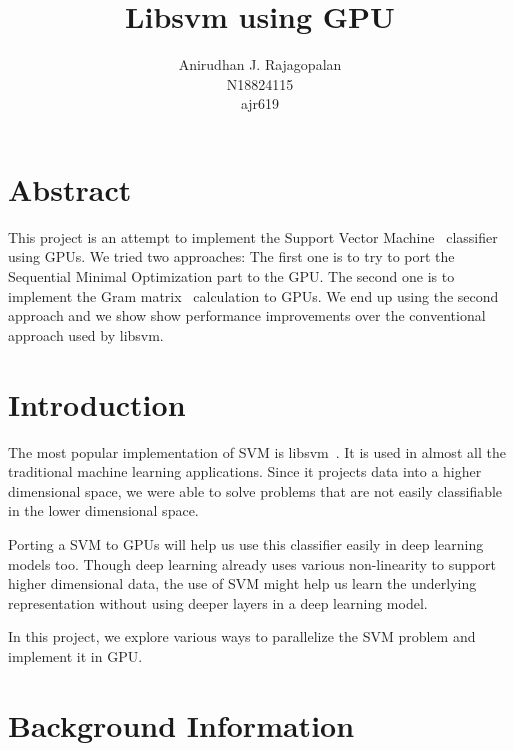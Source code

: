 \documentclass{article}
\begin{document}
\title{Libsvm using GPU}
\author{Anirudhan J. Rajagopalan \\ N18824115 \\ ajr619}
\maketitle




\newpage

\section{Abstract}
This project is an attempt to implement the Support Vector Machine~\cite{cortes1995} classifier using GPUs.
We tried two approaches: 
The first one is to try to port the Sequential Minimal Optimization part to the GPU\@.
The second one is to implement the Gram matrix~\cite{wiki:gram_matrix} calculation to GPUs.
We end up using the second approach and we show show performance improvements over the conventional approach used by libsvm. 
\section{Introduction}
The most popular implementation of SVM is libsvm~\cite{CC01a}.  
It is used in almost all the traditional machine learning applications.
Since it projects data into a higher dimensional space, we were able to solve problems that are not easily classifiable in the lower dimensional space.

Porting a SVM to GPUs will help us use this classifier easily in deep learning models too.
Though deep learning already uses various non-linearity to support higher dimensional data, the use of SVM might help us learn the underlying representation without using deeper layers in a deep learning model.

In this project, we explore various ways to parallelize the SVM problem and implement it in GPU\@.


\section{Background Information}
\end{document}

